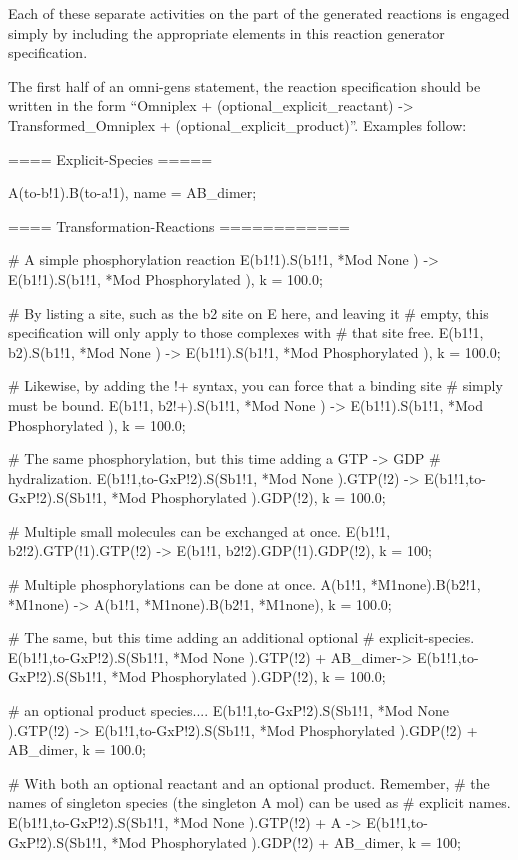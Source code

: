  Each of these separate activities on the part of the generated
 reactions is engaged simply by including the appropriate elements in
 this reaction generator specification.
 
 The first half of an omni-gens statement, the reaction specification
 should be written in the form ``Omniplex + (optional\_explicit\_reactant) ->
 Transformed\_Omniplex + (optional\_explicit\_product)''.  Examples follow:

\begin{ExampleMZR}

==== Explicit-Species =====

A(to-b!1).B(to-a!1), name = AB_dimer;


==== Transformation-Reactions ============

# A simple phosphorylation reaction
E(b1!1).S(b1!1, *Mod{ None }) -> E(b1!1).S(b1!1, *Mod{ Phosphorylated }),
     k = 100.0;

# By listing a site, such as the b2 site on E here, and leaving it
# empty, this specification will only apply to those complexes with
# that site free.
E(b1!1, b2).S(b1!1, *Mod{ None }) -> E(b1!1).S(b1!1, *Mod{ Phosphorylated }),
     k = 100.0;

# Likewise, by adding the !+ syntax, you can force that a binding site
# simply must be bound.
E(b1!1, b2!+).S(b1!1, *Mod{ None }) -> E(b1!1).S(b1!1, *Mod{ Phosphorylated }),
     k = 100.0;

# The same phosphorylation, but this time adding a GTP -> GDP
# hydralization.  
E(b1!1,to-GxP!2).S(Sb1!1, *Mod{ None }).GTP(!2) ->
  E(b1!1,to-GxP!2).S(Sb1!1, *Mod{ Phosphorylated }).GDP(!2),
    k = 100.0;

# Multiple small molecules can be exchanged at once.
E(b1!1, b2!2).GTP(!1).GTP(!2) -> E(b1!1, b2!2).GDP(!1).GDP(!2), k = 100;

# Multiple phosphorylations can be done at once.  
A(b1!1, *M1{none}).B(b2!1, *M1{none}) -> A(b1!1, *M1{none}).B(b2!1, *M1{none}),
   k = 100.0;

# The same, but this time adding an additional optional
# explicit-species. 
E(b1!1,to-GxP!2).S(Sb1!1, *Mod{ None }).GTP(!2) + AB\_dimer->
  E(b1!1,to-GxP!2).S(Sb1!1, *Mod{ Phosphorylated }).GDP(!2),
   k = 100.0;

# an optional product species....
E(b1!1,to-GxP!2).S(Sb1!1, *Mod{ None }).GTP(!2) ->
  E(b1!1,to-GxP!2).S(Sb1!1, *Mod{ Phosphorylated }).GDP(!2)  + AB\_dimer,
    k = 100.0;

# With both an optional reactant and an optional product.  Remember,
# the names of singleton species (the singleton A mol) can be used as
# explicit names.  
E(b1!1,to-GxP!2).S(Sb1!1, *Mod{ None }).GTP(!2) + A ->
  E(b1!1,to-GxP!2).S(Sb1!1, *Mod{ Phosphorylated }).GDP(!2)  + AB\_dimer,
    k = 100;
\end{ExampleMZR}

